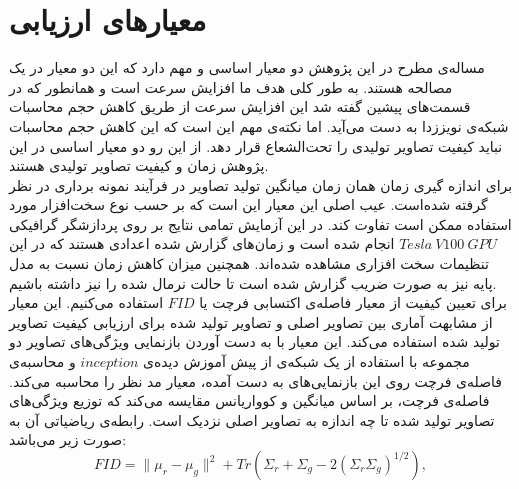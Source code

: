 \section{معیارهای ارزیابی}
مساله‌ی مطرح در این پژوهش دو معیار اساسی و مهم دارد که این دو معیار در یک مصالحه هستند. به طور کلی هدف ما افزایش سرعت است و همانطور که در قسمت‌های پیشین گفته شد این افزایش سرعت  از طریق کاهش حجم محاسبات شبکه‌ی نویززدا به دست می‌آید. اما نکته‌ی مهم این است که این کاهش حجم محاسبات نباید کیفیت تصاویر تولیدی را تحت‌الشعاع قرار دهد. از این رو دو معیار اساسی در این پژوهش زمان و کیفیت تصاویر تولیدی هستند.
\\
برای اندازه گیری زمان همان زمان میانگین تولید تصاویر در فرآیند نمونه برداری در نظر گرفته شده‌است. عیب اصلی این معیار این است که بر حسب نوع سخت‌افزار مورد استفاده ممکن است تفاوت کند. در این آزمایش تمامی نتایج بر روی پردازشگر گرافیکی $Tesla\ V100\ GPU$ انجام شده است و زمان‌های گزارش شده اعدادی هستند که در این تنظیمات سخت افزاری مشاهده شده‌اند. همچنین میزان کاهش زمان نسبت به مدل پایه نیز به صورت ضریب گزارش شده است تا حالت نرمال شده را نیز داشته باشیم.
\\
برای تعیین کیفیت از معیار فاصله‌ی اکتسابی فرچت یا $FID$ \cite{heusel2017gans} استفاده می‌کنیم. این معیار از مشابهت آماری بین تصاویر اصلی و تصاویر تولید شده برای ارزیابی کیفیت تصاویر تولید شده استفاده می‌کند. این معیار با به دست آوردن بازنمایی ویژگی‌های تصاویر دو مجموعه با استفاده از یک شبکه‌ی از پیش آموزش دیده‌ی $inception$ و محاسبه‌ی فاصله‌ی فرچت روی این بازنمایی‌های به دست آمده، معیار مد نظر را محاسبه می‌کند. فاصله‌ی فرچت، بر اساس میانگین و کوواریانس مقایسه می‌کند که توزیع ویژگی‌های تصاویر تولید شده تا چه اندازه به تصاویر اصلی نزدیک است. رابطه‌ی ریاضیاتی آن به صورت زیر می‌باشد:
\begin{equation}
	FID = \|\mu_r - \mu_g\|^2 + Tr(\Sigma_r + \Sigma_g - 2(\Sigma_r \Sigma_g)^{1/2}),
\end{equation} 

